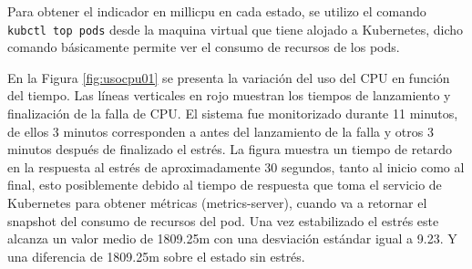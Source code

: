 
\par Para obtener el indicador en millicpu en cada estado, se utilizo el comando \\ \verb|kubctl top pods| desde la maquina virtual que tiene alojado a Kubernetes, dicho comando básicamente permite ver el consumo de recursos de los pods.\\


\par En la Figura \ref{fig:usocpu01} se presenta la variación del uso del CPU en función del tiempo. Las líneas verticales en rojo muestran los tiempos de lanzamiento y finalización de la falla de CPU. El sistema fue monitorizado durante 11 minutos, de ellos 3 minutos corresponden a antes del lanzamiento de la falla y otros 3 minutos después de finalizado el estrés. La figura muestra un tiempo de retardo en la respuesta al estrés de aproximadamente 30 segundos, tanto al inicio como al final, esto posiblemente debido al tiempo de respuesta que toma el servicio de Kubernetes para obtener métricas (metrics-server), cuando va a retornar el snapshot del consumo de recursos del pod. Una vez estabilizado el estrés este alcanza un valor medio de 1809.25m con una desviación estándar igual a 9.23. Y una diferencia de 1809.25m sobre el estado sin estrés.\\

